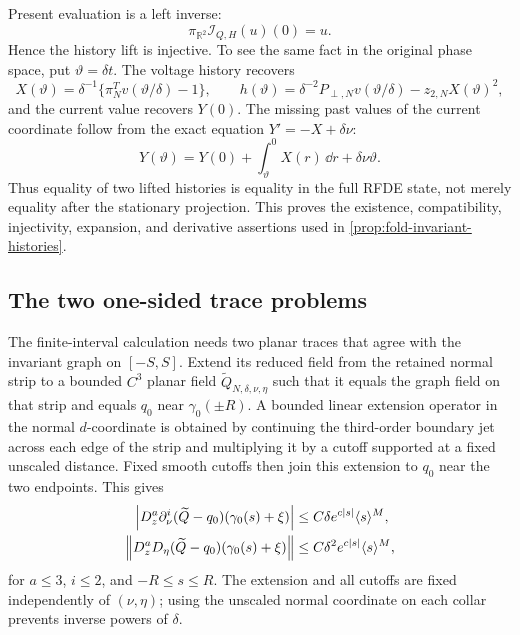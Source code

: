Present evaluation is a left inverse:
\begin{equation}
 \pi_{\mathbb R^2}\mathcal I_{Q,H}(u)(0)=u.
 \label{eq:supp-present-left-inverse}
\end{equation}
Hence the history lift is injective.  To see the same fact in the original
phase space, put \(\vartheta=\delta t\).  The voltage history recovers
\begin{equation}
 X(\vartheta)=\delta^{-1}\{\pi_N^Tv(\vartheta/\delta)-1\},\qquad
 h(\vartheta)=\delta^{-2}P_{\perp,N}v(\vartheta/\delta)
                  -z_{2,N}X(\vartheta)^2,
 \label{eq:supp-recover-X-h}
\end{equation}
and the current value recovers \(Y(0)\).  The missing past values of the
current coordinate follow from the exact equation \(Y'=-X+\delta\nu\):
\begin{equation}
 Y(\vartheta)=Y(0)+\int_\vartheta^0X(r)\,\dd r
                         +\delta\nu\vartheta.
 \label{eq:supp-recover-Y-history}
\end{equation}
Thus equality of two lifted histories is equality in the full RFDE state,
not merely equality after the stationary projection.  This proves the
existence, compatibility, injectivity, expansion, and derivative assertions
used in \cref{prop:fold-invariant-histories}.

\subsection{The two one-sided trace problems}

The finite-interval calculation needs two planar traces that agree with the
invariant graph on \([-S,S]\).  Extend its reduced field from the retained
normal strip to a bounded \(C^3\) planar field
\(\widetilde Q_{N,\delta,\nu,\eta}\) such that it equals the graph field on
that strip and equals \(q_0\) near \(\gamma_0(\pm R)\).  A bounded linear
extension operator in the normal \(d\)-coordinate is obtained by continuing
the third-order boundary jet across each edge of the strip and multiplying
it by a cutoff supported at a fixed unscaled distance.  Fixed smooth cutoffs
then join this extension to \(q_0\) near the two endpoints.  This gives
\begin{align}
 \left\lvert D_z^a\partial_\nu^i
       (\widetilde Q-q_0)(\gamma_0(s)+\xi)\right\rvert
 &\le C\delta e^{c\left\lvert s\right\rvert}\langle s\rangle^M,
 \label{eq:supp-planar-extension-bound}\\
 \left\lVert D_z^aD_\eta
       (\widetilde Q-q_0)(\gamma_0(s)+\xi)\right\rVert
 &\le C\delta^2e^{c\left\lvert s\right\rvert}\langle s\rangle^M,
 \label{eq:supp-planar-extension-structural}
\end{align}
for \(a\le3\), \(i\le2\), and \(-R\le s\le R\).  The extension and all
cutoffs are fixed independently of \((\nu,\eta)\); using the unscaled
normal coordinate on each collar prevents inverse powers of \(\delta\).

